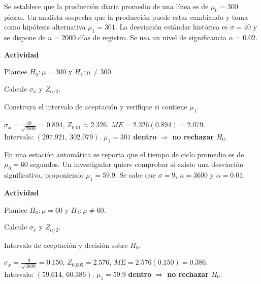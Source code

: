 \begin{ejercicio}[Producción de piezas diarias (n=2000)]
Se establece que la producción diaria promedio de una línea es de $\mu_0=300$ piezas.
Un analista sospecha que la producción puede estar cambiando y toma como hipótesis
alternativa $\mu_1=301$. La desviación estándar histórica es $\sigma=40$ y se
dispone de $n=2000$ días de registro. Se usa un nivel de significancia $\alpha=0.02$.


\textbf{Actividad}
\begin{pasos}
  \item Plantee $H_0:\mu=300$ y $H_1:\mu\neq300$.
  \item Calcule $\sigma_{\bar{x}}$ y $Z_{\alpha/2}$.
  \item Construya el intervalo de aceptación y verifique si contiene $\mu_1$.
\end{pasos}

\begin{clave}
$\sigma_{\bar{x}}=\frac{40}{\sqrt{2000}}=0.894$, \;
$Z_{0.01}\approx2.326$, \;
$ME=2.326(0.894)=2.079$.\\
Intervalo: $(297.921,\,302.079)$. \;
$\mu_1=301$ \textbf{dentro} $\Rightarrow$ \textbf{no rechazar $H_0$}.
\end{clave}
\end{ejercicio}


\begin{ejercicio}[Tiempo de ciclo en estación automática (n=3600)]
En una estación automática se reporta que el tiempo de ciclo promedio es de $\mu_0=60$ segundos.
Un investigador quiere comprobar si existe una desviación significativa, proponiendo $\mu_1=59.9$.
Se sabe que $\sigma=9$, $n=3600$ y $\alpha=0.01$.


\textbf{Actividad}
\begin{pasos}
  \item Plantee $H_0:\mu=60$ y $H_1:\mu\neq60$.
  \item Calcule $\sigma_{\bar{x}}$ y $Z_{\alpha/2}$.
  \item Intervalo de aceptación y decisión sobre $H_0$.
\end{pasos}

\begin{clave}
$\sigma_{\bar{x}}=\frac{9}{\sqrt{3600}}=0.150$, \;
$Z_{0.005}=2.576$, \;
$ME=2.576(0.150)=0.386$.\\
Intervalo: $(59.614,\,60.386)$. \;
$\mu_1=59.9$ \textbf{dentro} $\Rightarrow$ \textbf{no rechazar $H_0$}.
\end{clave}
\end{ejercicio}